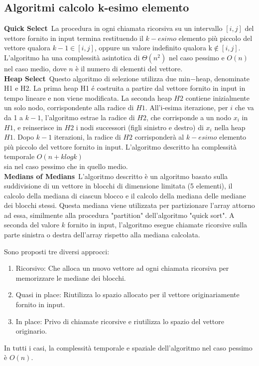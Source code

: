 \documentclass[a4paper]{article}
\begin{document}
\subsection{Algoritmi calcolo k-esimo elemento}
\textbf{Quick Select}\ La procedura in ogni chiamata ricorsiva su un intervallo $[i,j]$
 del vettore fornito in input termina restituendo il $k-esimo$ elemento più piccolo del vettore qualora $k-1\in[i,j]$, oppure un valore indefinito qualora k$\not\in[i,j]$. L'algoritmo ha una complessità asintotica di $\Theta(n^2)$
 nel caso pessimo e $O(n)$ nel caso medio, dove $n$ è il numero di elementi del 
 \vspace{2mm}
 vettore.\\
\textbf{Heap Select}\ Questo algoritmo di selezione utilizza due min$-$heap, denominate H1 e H2. La prima heap H1 é costruita a partire dal vettore fornito in input in tempo lineare e non viene modificata.
La seconda heap \( H2 \) contiene inizialmente un solo nodo, corrispondente alla radice di \( H1 \). All'i-esima iterazione, per \( i \) che va da 1 a \( k-1 \), l'algoritmo estrae la radice di \( H2 \), che corrisponde a un nodo \( x_i \) in \( H1 \), e reinserisce in \( H2 \) i nodi successori (figli sinistro e destro) di \( x_i \) nella heap \( H1 \). Dopo \( k-1 \) iterazioni, la radice di \( H2 \) corrisponderà al \( k-esimo \) elemento più piccolo del vettore fornito in input.
L'algoritmo descritto ha complessità temporale $O(n+klogk)$\\
\vspace{2mm}
sia nel caso pessimo che in quello medio.\\\textbf{Medians of Medians}\ L'algoritmo descritto è un algoritmo basato sulla suddivisione di un vettore in blocchi di dimensione limitata (5 elementi), il calcolo della mediana di ciascun blocco e il calcolo della mediana delle mediane dei blocchi stessi. Questa mediana viene utilizzata per partizionare l'array attorno ad essa, similmente alla procedura "partition" dell'algoritmo "quick sort". A seconda del valore \( k \) fornito in input, l'algoritmo esegue chiamate ricorsive sulla parte sinistra o destra dell'array rispetto alla mediana calcolata. 

Sono proposti tre diversi approcci:
\begin{enumerate}
    \item Ricorsivo: Che alloca un nuovo vettore ad ogni chiamata ricorsiva per memorizzare le mediane dei blocchi.
    \item Quasi in place: Riutilizza lo spazio allocato per il vettore originariamente fornito in input.
    \item In place: Privo di chiamate ricorsive e riutilizza lo spazio del vettore originario.
\end{enumerate}
In tutti i casi, la complessità temporale e spaziale dell'algoritmo nel caso pessimo è \( O(n) \).
\\
\end{document}
